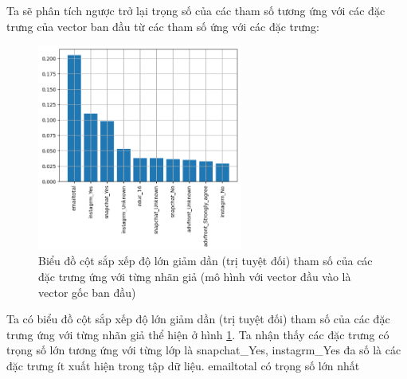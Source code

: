 \begin{enumerate}[label=(\alph*)]
    Ta sẽ phân tích ngược trở lại trọng số của các tham số tương ứng với các đặc trưng của vector ban đầu từ các tham số ứng với các đặc trưng:

    \begin{figure}[H]
        \centering
        \includegraphics[width=0.6\textwidth]{figures/Thanh/Models/Random_Forest/Non_null_models_Feature_Importance_Random_Forest_original_features.png}
        \caption{Biểu đồ cột sắp xếp độ lớn giảm dần (trị tuyệt đối) tham số của các đặc trưng ứng với từng nhãn giả (mô hình với vector đầu vào là vector gốc ban đầu)}
        \label{fig:Non_null_models_Feature_Importance_Random_Forest_original_features}
    \end{figure}

    Ta có biểu đồ cột sắp xếp độ lớn giảm dần (trị tuyệt đối) tham số của các đặc trưng ứng với từng nhãn giả thể hiện ở hình \ref{fig:Non_null_models_Feature_Importance_Random_Forest_original_features}.
    Ta nhận thấy các đặc trưng có trọng số lớn tương ứng với từng lớp là snapchat\_Yes, instagrm\_Yes đa số là các đặc trưng ít xuất hiện trong tập dữ liệu.
    emailtotal có trọng số lớn nhất
\end{enumerate}